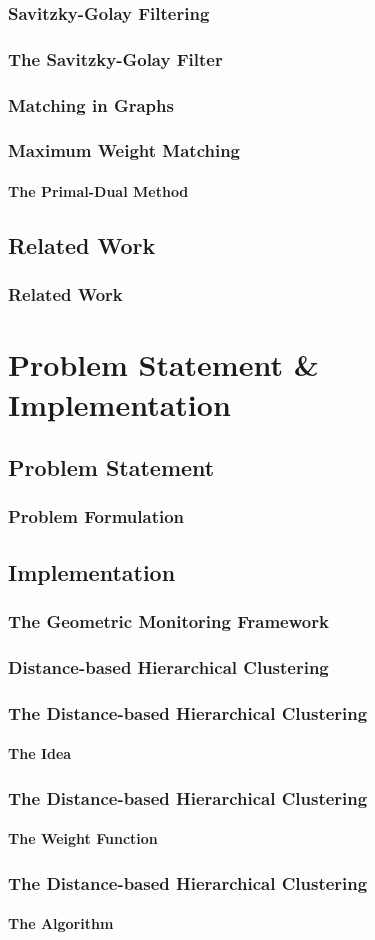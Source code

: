 \documentclass[hyperref={pdfpagelabels=false}]{beamer}
\begin{document}
\subsubsection*{Savitzky-Golay Filtering}
\begin{frame} \frametitle{The Savitzky-Golay Filter}

\end{frame}
\subsubsection*{Matching in Graphs}
\begin{frame} \frametitle{Maximum Weight Matching}\framesubtitle{The Primal-Dual Method}

\end{frame}

\subsection{Related Work}
\begin{frame} \frametitle{Related Work}

\end{frame}
\section{Problem Statement \& Implementation}
\subsection{Problem Statement}
\begin{frame} \frametitle{Problem Formulation}

\end{frame}
\subsection{Implementation}
\begin{frame} \frametitle{The Geometric Monitoring Framework}

\end{frame}
\subsubsection*{Distance-based Hierarchical Clustering}
\begin{frame} \frametitle{The Distance-based Hierarchical Clustering}\framesubtitle{The Idea}

\end{frame}
\begin{frame} \frametitle{The Distance-based Hierarchical Clustering}\framesubtitle{The Weight Function}

\end{frame}
\begin{frame} \frametitle{The Distance-based Hierarchical Clustering}\framesubtitle{The Algorithm}

\end{frame}
\end{document}
